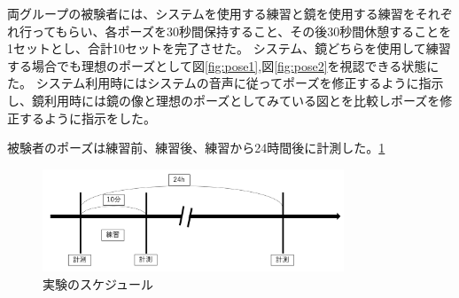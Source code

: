 両グループの被験者には、システムを使用する練習と鏡を使用する練習をそれぞれ行ってもらい、各ポーズを30秒間保持すること、その後30秒間休憩することを1セットとし、合計10セットを完了させた。
システム、鏡どちらを使用して練習する場合でも理想のポーズとして図\ref{fig:pose1},図\ref{fig:pose2}を視認できる状態にた。
システム利用時にはシステムの音声に従ってポーズを修正するように指示し、鏡利用時には鏡の像と理想のポーズとしてみている図とを比較しポーズを修正するように指示をした。

被験者のポーズは練習前、練習後、練習から24時間後に計測した。\ref{fig:schedule}

\begin{figure}[H]
\begin{center}
\includegraphics[width=9cm]{figures/schedule.png}
\caption{実験のスケジュール}
\label{fig:schedule}
\end{center}
\end{figure}
